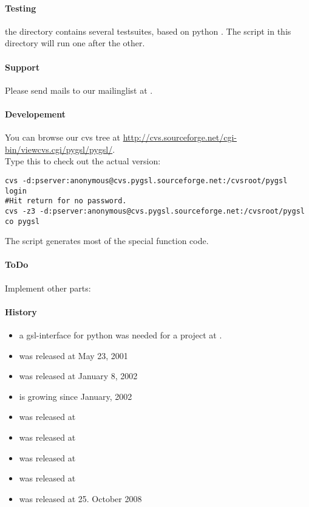 \paragraph*{Testing}
the directory  contains several testsuites, based on python
.
The script  in this directory will run one after the other.

\paragraph*{Support}
Please send mails to our mailinglist at
.

\paragraph*{Developement}
You can browse our cvs tree at
\url{http://cvs.sourceforge.net/cgi-bin/viewcvs.cgi/pygsl/pygsl/}.
\\
Type this to check out the actual version:
\begin{verbatim}
cvs -d:pserver:anonymous@cvs.pygsl.sourceforge.net:/cvsroot/pygsl login
#Hit return for no password.
cvs -z3 -d:pserver:anonymous@cvs.pygsl.sourceforge.net:/cvsroot/pygsl co pygsl
\end{verbatim}
The script  generates most of the special 
function code.

%
\paragraph*{ToDo}
Implement other parts:


\paragraph*{History}
\begin{itemize}
\item a gsl-interface for python was needed for a project at
.
\item {} was released at May 23, 2001
\item {} was released at January 8, 2002
\item {} is growing since January, 2002
\item {} was released at 
\item {} was released at 
\item {} was released at 
\item {} was released at 
\item {} was released at 25. October 2008
\end{itemize}

